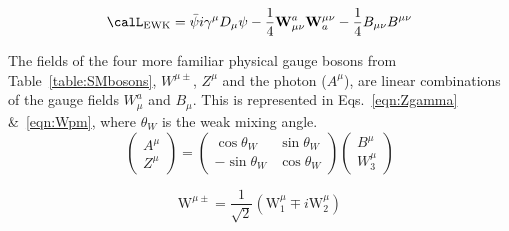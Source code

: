 
\begin{equation}
\label{eq:EWK_L}
\calL_\textrm{EWK}  = \bar{\psi} i \gamma^\mu D_\mu  \psi - \frac{1}{4}\mathbf{W}_{\mu\nu}^{a} \mathbf{W}^{\mu\nu}_{a}  -\frac{1}{4}B_{\mu\nu} B^{\mu\nu}
\end{equation}


The fields of the four more familiar physical gauge bosons from Table~\ref{table:SMbosons}, $W^{\mu\pm}$, $Z^{\mu}$ and the photon ($A^{\mu}$), are linear combinations of the gauge fields ${W}_{\mu}^{a}$ and $B_\mu$. This is represented in Eqs.~\ref{eqn:Zgamma} \&~\ref{eqn:Wpm}, where $\theta_{W}$ is the weak mixing angle.
\begin{equation}
\label{eqn:Zgamma}
{\begin{pmatrix}
A^{\mu} \\
{Z^{\mu}} 
\end{pmatrix}}
=
{\begin{pmatrix}
\cos\theta_{W} & \sin\theta_{W} \\
-\sin\theta_{W} & \cos\theta_{W} 
\end{pmatrix}}
{\begin{pmatrix}
{B}^{\mu} \\
{W}_{3}^{\mu}
\end{pmatrix}}
\end{equation}

\begin{equation}
\label{eqn:Wpm}
\textrm{W}^{\mu\pm}=\frac{1}{\sqrt{2}}\left(\textrm{W}_{1}^{\mu} \mp i\textrm{W}_{2}^{\mu}\right)
\end{equation}


